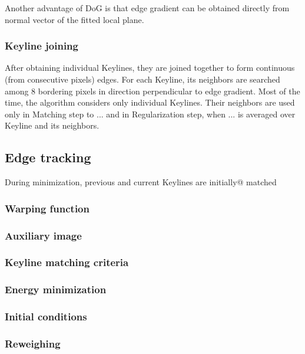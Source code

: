 Another advantage of DoG is that edge gradient can be obtained directly from normal vector of the fitted local plane.

\subsubsection{Keyline joining}

After obtaining individual Keylines, they are joined together to form continuous (from consecutive pixels) edges. %
For each Keyline, its neighbors are searched among 8 bordering pixels in direction perpendicular to edge gradient.
Most of the time, the algorithm considers only individual Keylines. Their neighbors are used only in Matching step to ... %
and in Regularization step, when ... %
is averaged over Keyline and its neighbors.



\subsection{Edge tracking}

During minimization, previous and current Keylines are initially@ matched

\subsubsection{Warping function}

\subsubsection{Auxiliary image}

\subsubsection{Keyline matching criteria}


\subsubsection{Energy minimization}

\subsubsection{Initial conditions}

\subsubsection{Reweighing}

